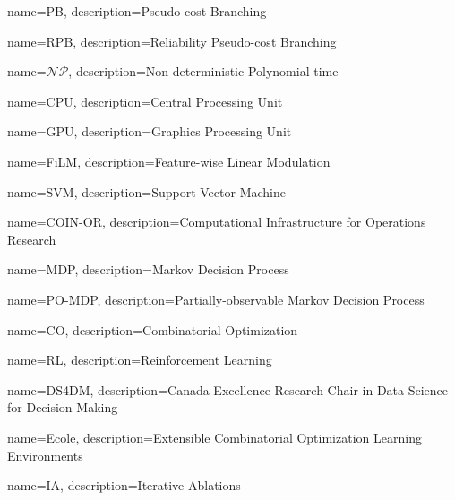 {
        name=PB,
        description={Pseudo-cost Branching}
}

{
        name=RPB,
        description={Reliability Pseudo-cost Branching}
}

{
        name=$\mathcal{NP}$,
        description={Non-deterministic Polynomial-time}
}

{
        name=CPU,
        description={Central Processing Unit}
}

{
        name=GPU,
        description={Graphics Processing Unit}
}

{
        name=FiLM,
        description={Feature-wise Linear Modulation}
}

{
        name=SVM,
        description={Support Vector Machine}
}

{
        name=COIN-OR,
        description={Computational Infrastructure for Operations Research}
}

{
        name=MDP,
        description={Markov Decision Process}
}

{
        name=PO-MDP,
        description={Partially-observable Markov Decision Process}
}

{
        name=CO,
        description={Combinatorial Optimization}
}

{
        name=RL,
        description={Reinforcement Learning}
}

{
        name=DS4DM,
        description={Canada Excellence Research Chair in Data Science for Decision Making}
}

{
        name=Ecole,
        description={Extensible Combinatorial Optimization Learning Environments}
}

{
        name=IA,
        description={Iterative Ablations}
}
